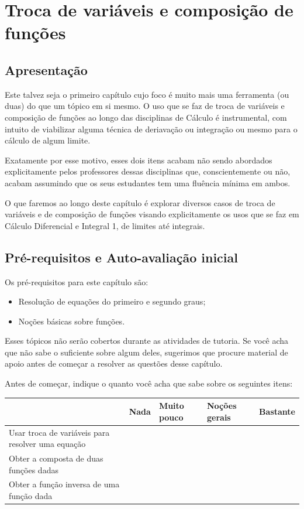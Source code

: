 \documentclass[main.tex]{subfiles}
\begin{document}
\chapter{Troca de variáveis e composição de funções}

\section{Apresentação}

Este talvez seja o primeiro capítulo cujo foco é muito mais uma ferramenta (ou duas) do que um tópico em si mesmo. O uso que se faz de troca de variáveis e composição de funções ao longo das disciplinas de Cálculo é instrumental, com intuito de viabilizar alguma técnica de deriavação ou integração ou mesmo para o cálculo de algum limite.

Exatamente por esse motivo, esses dois itens acabam não sendo abordados explicitamente pelos professores dessas disciplinas que, conscientemente ou não, acabam assumindo que os seus estudantes tem uma fluência mínima em ambos.

O que faremos ao longo deste capítulo é explorar diversos casos de troca de variáveis e de composição de funções visando explicitamente os usos que se faz em Cálculo Diferencial e Integral 1, de limites até integrais.

\newpage

\section{Pré-requisitos e Auto-avaliação inicial}

Os pré-requisitos para este capítulo são:
\begin{itemize}
 \item Resolução de equações do primeiro e segundo graus;
 \item Noções básicas sobre funções.
\end{itemize}

Esses tópicos não serão cobertos durante as atividades de tutoria. Se você acha que não sabe o suficiente sobre algum deles, sugerimos que procure material de apoio antes de começar a resolver as questões desse capítulo.

\paraFolhaAvaliacoes

Antes de começar, indique o quanto você acha que sabe sobre os seguintes itens:

\begin{center}
 \begin{tabular}{|p{35mm}||p{15mm}|p{15mm}|p{15mm}|p{15mm}|} 
 \hline
   & Nada & Muito pouco & Noções gerais & Bastante\\
 \hline
 Usar troca de variáveis para resolver uma equação &  &  &  &  \\ 
 \hline
 Obter a composta de duas funções dadas &  &  &  &  \\
 \hline
 Obter a função inversa de uma função dada &  &  &  &  \\
 \hline
\end{tabular}
\end{center}
\end{document}

